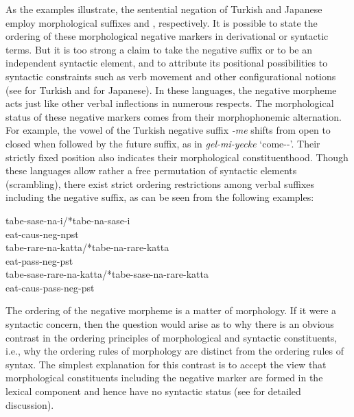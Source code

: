 \documentclass[output=paper]{langsci/langscibook}
\begin{document}
{\noindent
As the examples illustrate, the sentential negation of Turkish and Japanese employ
morphological suffixes   and ,
respectively.
It is possible to state the ordering
of these morphological negative markers in derivational
or syntactic terms. But it is too strong a claim to
take the negative suffix  or   to be an independent syntactic element,
and to attribute its positional possibilities to syntactic constraints
such as verb movement and other configurational notions (see \citet{kelepir} for
Turkish and \citet{Kato:97,Kato:00} for Japanese).
%
In these languages, the negative morpheme acts just like
other verbal inflections in numerous respects.
%
%
%
%
%
The morphological status of
these negative markers comes from their morphophonemic alternation.
For example, the vowel of the Turkish negative suffix {\it -me} shifts from open to closed when followed by the
future suffix, as in {\it gel-mi-yecke} `come-\NEG-\FUT'.  Their
strictly fixed position also indicates their morphological
constituenthood. Though these languages allow rather a free permutation of
syntactic elements (scrambling), there exist strict ordering restrictions among
verbal suffixes including the negative suffix, as can be seen from
the following examples:

\eal
\ex
\gll tabe-sase-na-i/*tabe-na-sase-i \\
     eat-{\sc caus}-{\sc neg}-{\sc npst} \\

\ex
\gll tabe-rare-na-katta/*tabe-na-rare-katta \\
     eat-{\sc pass}-{\sc neg}-{\sc pst} \\

\ex
\gll tabe-sase-rare-na-katta/*tabe-sase-na-rare-katta \\
     eat-{\sc caus}-{\sc pass}-{\sc neg}-{\sc pst} \\
\zl

\noindent
The ordering of the negative morpheme is a matter of morphology.
If it were a syntactic concern, then
the question would arise as to why
there is an obvious contrast in the ordering principles
of morphological and syntactic constituents, i.e., why the ordering
rules of morphology are distinct from the ordering rules of syntax. The
simplest explanation for this contrast is to accept
the view that morphological constituents including the negative marker
are formed in the lexical component and hence have no syntactic
status (see \citet{Kim:00} for detailed discussion).

}
\end{document}
